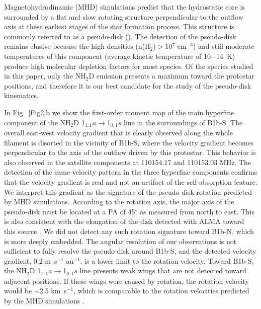 \documentclass[letter]{aa}
\begin{document}
Magnetohydrodinamic (MHD) simulations predict that the hydrostatic core is surrounded by a flat and slow rotating structure 
perpendicular to the outflow axis at these earliest
stages of the star
formation process. This structure is commonly referred to as
a pseudo-disk 
(\citealp{Hincelin16}). The detection of the pseudo-disk
remains elusive because the high densities
(n(H$_2$)$>$10$^7$ cm$^{-3}$) and still moderate temperatures of this component
(average kinetic temperature of 10$-$14~K) produce high molecular depletion factors
for most species. Of the species studied in this paper,
only the NH$_2$D emission presents a maximum toward the protostar positions, and
therefore it is our best candidate for the study of the pseudo-disk kinematics.

In Fig.~\ref{Fig2}b we show the first-order moment map of the main hyperfine 
component of the NH$_2$D 1$_{1,1}a$$\rightarrow$1$_{0,1}s$ line in the surroundings
of B1b-S. The overall east-west velocity gradient that is clearly observed along the whole 
filament is disorted in the vicinity of B1b-S, where the velocity gradient becomes perpendicular to the 
axis of the outflow driven by this protostar. This behavior is also observed in 
the satellite components at 110154.17 and 110153.03 MHz. The detection of the same velocity
pattern in the three hyperfine components confirms that the velocity gradient is real and not an artifact of the self-absorption feature.
We interpret this gradient as the signature of the pseudo-disk rotation predicted by MHD simulations.
According to the rotation axis, the major axis of the pseudo-disk must be located at a PA 
of 45$^{\circ}$ as measured from north to east. This is also consistent with
the elongation of the disk detected with ALMA toward this source \citet{Gerin16}. 
We did not detect any such rotation signature toward B1b-N, which is more deeply embedded.
The angular resolution of our observations is not sufficient to fully resolve the pseudo-disk around B1b-S,
and the detected velocity gradient, 0.2 m~s$^{-1}$ au$^{-1}$, is a lower limit to the rotation 
velocity.  
Toward B1b-S, the  NH$_2$D  1$_{1,1}a$$\rightarrow$1$_{0,1}s$ line presents weak 
wings that are not detected toward adjacent positions. If these wings were caused by 
rotation, the rotation velocity would be $\sim$2.5 km~s$^{-1}$, which is comparable 
to the rotation velocities predicted by the MHD simulations \citep{Galli93,Hincelin16}.
\end{document}
